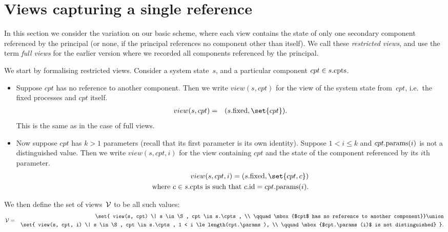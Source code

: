 \section{Views capturing a single reference}
\label{sec:singleRef}

In this section we consider the variation on our basic scheme, where each view
contains the state of only one secondary component referenced by the principal
(or none, if the principal references no component other than itself).  We
call these \emph{restricted views}, and use the term \emph{full views} for the
earlier version where we recorded all components referenced by the principal. 

We start by formalising restricted views.  Consider a system state~$s$, and a
particular component $cpt \in s.\mathrm{cpts}$.
\begin{itemize}
\item 
Suppose $cpt$ has no reference to another component.  Then we write $view(s,
cpt)$ for the view of the system state from~$cpt$, i.e.~the fixed processes
and $cpt$ itself.
\begin{eqnarray*}
view(s, cpt) & = &  (s.\fixed, \set{cpt}).
\end{eqnarray*}
This is the same as in the case of full views.

\item
Now suppose $cpt$ has $k > 1$ parameters (recall that its first parameter is
its own identity).  Suppose $1 < i \le k$ and $cpt.\mathrm{params}(i)$ is not a
distinguished value.  Then we write $view(s, cpt, i)$ for the view containing
$cpt$ and the state of the component referenced by its $i$th parameter.
\[
\begin{align}
view(s, cpt, i)  =  (s.\fixed, \set{cpt, c})\\ 
\mbox{where $c \in s.\cpt$ is such that $c.\id = cpt.\params(i)$}.
\end{align}
\]
\end{itemize}
%
We then define the set of views~$\mathcal{V}$ to be all such values:
%
\begin{eqnarray*}
\V & = & 
  \begin{align}
  \set{ view(s, cpt) \| s \in \S, cpt \in s.\cpts, \\
    \qquad   \mbox{$cpt$ has no reference to another component}} \union\null
  \\
  \set{ view(s, cpt, i) \| s \in \S, cpt \in s.\cpts, 
    1 < i \le length(cpt.\params), \\
    \qquad \mbox{$cpt.\params(i)$ is not distinguished} }.
  \end{align}
\end{eqnarray*}

